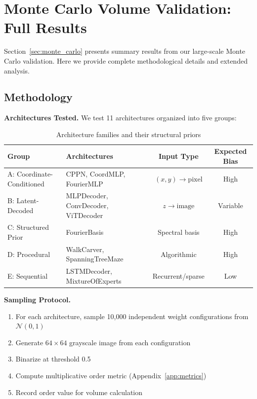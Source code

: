 \section{Monte Carlo Volume Validation: Full Results}
\label{app:monte_carlo}


Section~\ref{sec:monte_carlo} presents summary results from our large-scale Monte Carlo validation. Here we provide complete methodological details and extended analysis.

\subsection{Methodology}

\textbf{Architectures Tested.} We test 11 architectures organized into five groups:

\begin{table}[H]
\centering
\caption{Architecture families and their structural priors}
\label{tab:mc_architecture_groups}
\begin{tabular}{llcc}
\toprule
Group & Architectures & Input Type & Expected Bias \\
\midrule
A: Coordinate-Conditioned & CPPN, CoordMLP, FourierMLP & $(x,y) \to \text{pixel}$ & High \\
B: Latent-Decoded & MLPDecoder, ConvDecoder, ViTDecoder & $z \to \text{image}$ & Variable \\
C: Structured Prior & FourierBasis & Spectral basis & High \\
D: Procedural & WalkCarver, SpanningTreeMaze & Algorithmic & High \\
E: Sequential & LSTMDecoder, MixtureOfExperts & Recurrent/sparse & Low \\
\bottomrule
\end{tabular}
\end{table}

\textbf{Sampling Protocol.}
\begin{enumerate}
    \item For each architecture, sample 10,000 independent weight configurations from $\mathcal{N}(0, 1)$
    \item Generate $64 \times 64$ grayscale image from each configuration
    \item Binarize at threshold 0.5
    \item Compute multiplicative order metric (Appendix~\ref{app:metrics})
    \item Record order value for volume calculation
\end{enumerate}

